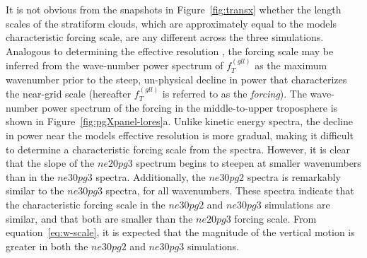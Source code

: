 \documentclass{agujournal}
\begin{document}
It is not obvious from the snapshots in Figure~\ref{fig:transx} whether the length scales of the stratiform clouds, which are approximately equal to the models characteristic forcing scale, are any different across the three simulations. Analogous to determining the effective resolution \citep{S2011LNCSE}, the forcing scale may be inferred from the wave-number power spectrum of $f_T^{(gll)}$ as the maximum wavenumber prior to the steep, un-physical decline in power that characterizes the near-grid scale (hereafter $f_T^{(gll)}$ is referred to as the {\em{forcing}}). The wave-number power spectrum of the forcing in the middle-to-upper troposphere is shown in Figure~\ref{fig:pgXpanel-lores}a. Unlike kinetic energy spectra, the decline in power near the models effective resolution is more gradual, making it difficult to determine a characteristic forcing scale from the spectra. However, it is clear that the slope of the $ne20pg3$ spectrum begins to steepen at smaller wavenumbers than in the $ne30pg3$ spectra. Additionally, the $ne30pg2$ spectra is remarkably similar to the $ne30pg3$ spectra, for all wavenumbers. These spectra indicate that the characteristic forcing scale in the $ne30pg2$ and $ne30pg3$ simulations are similar, and that both are smaller than the $ne20pg3$ forcing scale. From equation~\eqref{eq:w-scale}, it is expected that the magnitude of the vertical motion is greater in both the $ne30pg2$ and $ne30pg3$ simulations.
\end{document}
